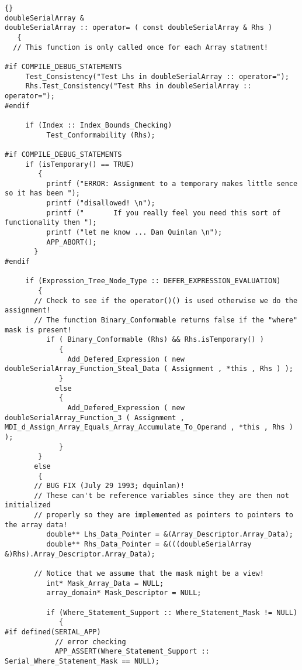 \documentclass[10pt]{llncs}
\begin{document}
\begin{lstlisting}{}
doubleSerialArray & 
doubleSerialArray :: operator= ( const doubleSerialArray & Rhs )
   {
  // This function is only called once for each Array statment!

#if COMPILE_DEBUG_STATEMENTS
     Test_Consistency("Test Lhs in doubleSerialArray :: operator=");
     Rhs.Test_Consistency("Test Rhs in doubleSerialArray :: operator=");
#endif

     if (Index :: Index_Bounds_Checking)
          Test_Conformability (Rhs);

#if COMPILE_DEBUG_STATEMENTS
     if (isTemporary() == TRUE)
        {
          printf ("ERROR: Assignment to a temporary makes little sence so it has been ");
          printf ("disallowed! \n");
          printf ("       If you really feel you need this sort of functionality then ");
          printf ("let me know ... Dan Quinlan \n");
          APP_ABORT();
       }
#endif

     if (Expression_Tree_Node_Type :: DEFER_EXPRESSION_EVALUATION)
        {
       // Check to see if the operator()() is used otherwise we do the assignment!
       // The function Binary_Conformable returns false if the "where" mask is present!
          if ( Binary_Conformable (Rhs) && Rhs.isTemporary() )
             {
               Add_Defered_Expression ( new doubleSerialArray_Function_Steal_Data ( Assignment , *this , Rhs ) );
             }
            else
             {
               Add_Defered_Expression ( new doubleSerialArray_Function_3 ( Assignment , MDI_d_Assign_Array_Equals_Array_Accumulate_To_Operand , *this , Rhs ) );
             }
        }
       else
        {
       // BUG FIX (July 29 1993; dquinlan)!
       // These can't be reference variables since they are then not initialized 
       // properly so they are implemented as pointers to pointers to the array data!
          double** Lhs_Data_Pointer = &(Array_Descriptor.Array_Data);
          double** Rhs_Data_Pointer = &(((doubleSerialArray &)Rhs).Array_Descriptor.Array_Data);

       // Notice that we assume that the mask might be a view!
          int* Mask_Array_Data = NULL;
          array_domain* Mask_Descriptor = NULL;

          if (Where_Statement_Support :: Where_Statement_Mask != NULL)
             {
#if defined(SERIAL_APP)
            // error checking
            APP_ASSERT(Where_Statement_Support :: Serial_Where_Statement_Mask == NULL);


\end{lstlisting}
\end{document}
